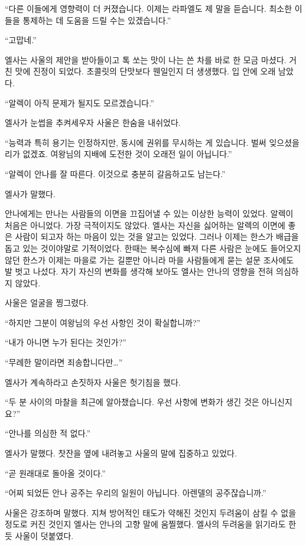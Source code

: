 ``다른 이들에게 영향력이 더 커졌습니다. 이제는 라파엘도 제 말을 듣습니다. 최소한 이들을 통제하는 데 도움을 드릴 수는 있겠습니다.''

``고맙네.''

엘사는 사울의 제안을 받아들이고 톡 쏘는 맛이 나는 쓴 차를 바로 한 모금 마셨다. 거친 맛에 진정이 되었다. 초콜릿의 단맛보다 웬일인지 더 생생했다. 입 안에 오래 남았다.

``알렉이 아직 문제가 될지도 모르겠습니다.''

엘사가 눈썹을 추켜세우자 사울은 한숨을 내쉬었다.

``능력과 특히 용기는 인정하지만, 동시에 권위를 무시하는 게 있습니다. 벌써 잊으셨을 리가 없겠죠. 여왕님의 지배에 도전한 것이 오래전 일이 아닙니다.''

``알렉이 안나를 잘 따른다. 이것으로 충분히 갈음하고도 남는다.''

엘사가 말했다.

안나에게는 만나는 사람들의 이면을 끄집어낼 수 있는 이상한 능력이 있었다. 알렉이 처음은 아니었다. 가장 극적이지도 않았다. 엘사는 자신을 싫어하는 알렉의 이면에 좋은 사람이 되고자 하는 마음이 있는 것을 알고는 있었다. 그러나 이제는 한스가 배급을 돕고 있는 것이야말로 기적이었다. 한때는 복수심에 빠져 다른 사람은 눈에도 들어오지 않던 한스가 이제는 마을로 가는 길뿐만 아니라 마을 사람들에게 묻는 설문 조사에도 발 벗고 나섰다. 자기 자신의 변화를 생각해 보아도 엘사는 안나의 영향을 전혀 의심하지 않았다.

사울은 얼굴을 찡그렸다.

``하지만 그분이 여왕님의 우선 사항인 것이 확실합니까?''

``내가 아니면 누가 된다는 것인가?''

``무례한 말이라면 죄송합니다만\ldots''

엘사가 계속하라고 손짓하자 사울은 헛기침을 했다.

``두 분 사이의 마찰을 최근에 알아챘습니다. 우선 사항에 변화가 생긴 것은 아니신지요?''

``안나를 의심한 적 없다.''

엘사가 말했다. 찻잔을 옆에 내려놓고 사울의 말에 집중하고 있었다.

``곧 원래대로 돌아올 것이다.''

``어찌 되었든 안나 공주는 우리의 일원이 아닙니다. 아렌델의 공주잖습니까.''

사울은 강조하며 말했다. 지쳐 방어적인 태도가 약해진 것인지 두려움이 삼킬 수 없을 정도로 커진 것인지 엘사는 안나의 고향 말에 움찔했다. 엘사의 두려움을 읽기라도 한 듯 사울이 덧붙였다.

